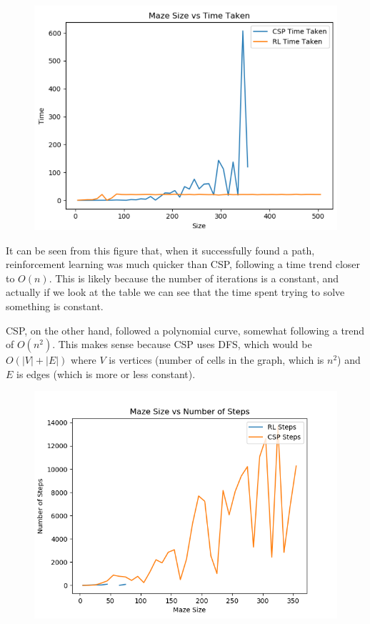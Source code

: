 \documentclass{article}
\newcommand\tab[1][1cm]{\hspace*{#1}}
\begin{document}
        \begin{figure}[h]
            \centering
            \includegraphics[scale=0.6]{assets/TimeOnly.png}
            \label{TimeAndSteps}
        \end{figure}

         \tab It can be seen from this figure that, when it successfully found a 
         path, reinforcement learning was much quicker than CSP, following a 
         time trend closer to $O(n)$. This is likely because the number of
         iterations is a constant, and actually if we look at the table we can
         see that the time spent trying to solve something is constant. 

         \tab CSP, on the other hand, followed a polynomial curve, somewhat 
         following a trend of $O(n^2)$. This makes sense because CSP 
         uses DFS, which would be $O(|V|+|E|)$ where $V$ is vertices (number 
         of cells in the graph, which is $n^2$) and $E$ is edges (which is 
         more or less constant).

        \begin{figure}[h]
            \centering
            \includegraphics[scale=0.6]{assets/StepsOnly.png}
            \label{StepsOnly}
        \end{figure}
\end{document}
